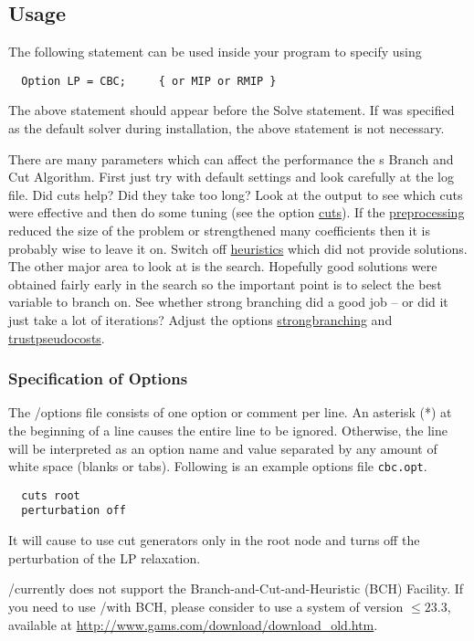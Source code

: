 \subsection{Usage}

The following statement can be used inside your \MYGAMS program to specify using \CBC
\begin{verbatim}
  Option LP = CBC;     { or MIP or RMIP }
\end{verbatim}

The above statement should appear before the Solve statement.
If \CBC was specified as the default solver during \MYGAMS installation, the above statement is not necessary.

There are many parameters which can affect the performance the \CBC{}s Branch and Cut Algorithm.
First just try with default settings and look carefully at the log file.
Did cuts help? Did they take too long? Look at the output to see which cuts were effective and then do some tuning (see the option \hyperlink{cuts}{cuts}).
If the \hyperlink{preprocess}{preprocessing} reduced the size of the problem or strengthened many coefficients then it is probably wise to leave it on.
Switch off \hyperlink{heuristics}{heuristics} which did not provide solutions.
The other major area to look at is the search.
Hopefully good solutions were obtained fairly early in the search so the important point is to select the best variable to branch on.
See whether strong branching did a good job -- or did it just take a lot of iterations?
Adjust the options \hyperlink{strongbranching}{strongbranching} and \hyperlink{trustpseudocosts}{trustpseudocosts}.

\subsubsection{Specification of Options}

The \MYGAMS/\CBC options file consists of one option or comment per line.
An asterisk (*) at the beginning of a line causes the entire line to be ignored.
Otherwise, the line will be interpreted as an option name and value separated by any amount of white space (blanks or tabs).
Following is an example options file \texttt{cbc.opt}.
\begin{verbatim}
  cuts root
  perturbation off
\end{verbatim}
It will cause \CBC to use cut generators only in the root node and turns off the perturbation of the LP relaxation.

\MYGAMS/\CBC currently does not support the \MYGAMS Branch-and-Cut-and-Heuristic (BCH) Facility.
If you need to use \MYGAMS/\CBC with BCH, please consider to use a \MYGAMS system of version $\leq 23.3$, available at \url{http://www.gams.com/download/download_old.htm}.

